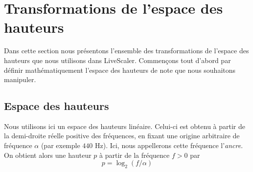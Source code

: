 \documentclass{article}
\begin{document}
\section{Transformations de l'espace des hauteurs}
\begin{comment}
  \subsection{Quelles transformations de gamme autoriser ?}
Les transformation affines de la forme $an + b$ où $n$ est la note de départ.
\subsection{Pourquoi ces transformations ?}
\begin{enumerate}
  \item Ces transformations sont adaptées à la musique tonale occidentale : passage du majeur au mineur.
  \item Elles sont facilement implémentables
  \item Elles peuvent être exprimées par une paire d'entiers, ce qui permet de les communiquer directement via MIDI.
\end{enumerate}


\subsection{Peut-on quand même sortir de la tonalité ?}
Oui : \begin{enumerate}
  \item on peut passer d'une gamme quelconque à une gamme par tons
  \item elles s'appliquent dans un contexte microtonal
  \item Possibilité d'ajouter une permutation quelconque personnalisée
\end{enumerate} 
\end{comment}
Dans cette section nous présentons l'ensemble des transformations de l'espace des hauteurs que nous utilisons dans LiveScaler. Commençons tout d'abord par définir mathématiquement l'espace des hauteurs de note que nous souhaitons manipuler.

\subsection{Espace des hauteurs}
Nous utilisons ici un espace des hauteurs linéaire. Celui-ci est obtenu à partir de la demi-droite réelle positive des fréquences, en fixant une origine arbitraire de fréquence $\alpha$ (par exemple $440$ Hz). Ici, nous appellerons cette fréquence l'\emph{ancre}. On obtient alors une hauteur $p$ à partir de la fréquence $f>0$ par
$$p = \log_2(f/\alpha)$$
\end{document}
